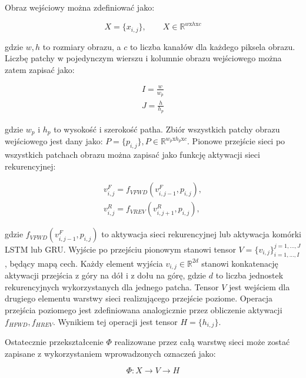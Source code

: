 \documentclass[oneside, mag]{mgr}
\begin{document}
Obraz wejściowy można zdefiniować jako:

\begin{equation}
	X = \{x_{i,j}\},\qquad X \in \mathbb{R}^{w \textrm{x} h \textrm{x} c}
\end{equation}

gdzie $w, h$ to rozmiary obrazu, a $c$ to liczba kanałów dla każdego piksela obrazu. Liczbę patchy w pojedynczym wierszu i kolumnie obrazu wejściowego można zatem zapisać jako:

\begin{gather}
	I=\frac{w}{w_p} \\
	J=\frac{h}{h_p} \nonumber
\end{gather}

gdzie $w_p$ i $h_p$ to wysokość i szerokość patha. Zbiór wszystkich patchy obrazu wejściowego jest dany jako: $P = \{p_{i,j}\}, P \in \mathbb{R}^{w_p \textrm{x} h_p \textrm{x} c}$. Pionowe przejście sieci po wszystkich patchach obrazu można zapisać jako funkcję aktywacji sieci rekurencyjnej:

\begin{gather}
    v_{i,j}^{F} = f_{VFWD} (v_{i,j-1}^F, p_{i,j}), \\
    v_{i,j}^{R} = f_{VREV} (v_{i,j+1}^R, p_{i,j}), \nonumber
\end{gather}

gdzie $f_{VFWD} (v_{i,j-1}^F, p_{i,j})$ to aktywacja sieci rekurencyjnej lub aktywacja komórki LSTM lub GRU. Wyjście po przejściu pionowym stanowi tensor $V = \{v_{i,j}\}_{i=1,...,I}^{j=1,...,J}$, będący mapą cech. Każdy element wyjścia $v_{i,j} \in \mathbb{R}^{2d}$ stanowi konkatenację aktywacji przejścia z góry na dół i z dołu na górę, gdzie $d$ to liczba jednostek rekurencyjnych wykorzystanych dla jednego patcha. Tensor $V$ jest wejściem dla drugiego elementu warstwy sieci realizującego przejście poziome. Operacja przejścia poziomego jest zdefiniowana analogicznie przez obliczenie aktywacji $f_{HFWD}, f_{HREV}$. Wynikiem tej operacji jest tensor $H = \{h_{i,j}\}$. 

Ostatecznie przekształcenie $\Phi$ realizowane przez całą warstwę sieci może zostać zapisane z wykorzystaniem wprowadzonych oznaczeń jako:

\begin{equation}
	\Phi: X \rightarrow V \rightarrow H
\end{equation}
\end{document}

